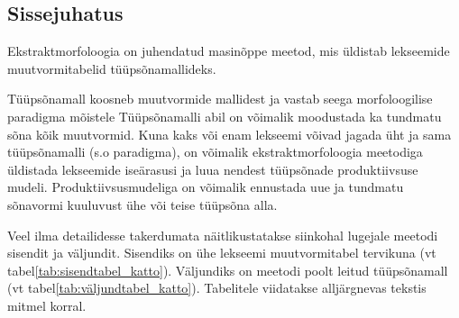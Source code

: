 \documentclass[12pt,a4paper]{article}
\begin{document}
\subsection{Sissejuhatus}
\label{sec:ekstraktmorfoloogia-sissejuhatus}

Ekstraktmorfoloogia on juhendatud masinõppe meetod, mis üldistab lekseemide muutvormitabelid tüüpsõnamallideks.

Tüüpsõna\-mall koosneb muutvormide mallidest ja vastab seega morfoloogilise paradigma mõistele
Tüüpsõna\-malli abil on võimalik moodustada ka tundmatu sõna kõik muutvormid.
Kuna kaks või enam lekseemi võivad jagada üht ja sama tüüpsõna\-malli (s.o paradigma), on võimalik ekstrakt\-morfoloogia meetodiga üldistada lekseemide iseärasusi ja luua nendest tüüpsõnade produktiivsuse mudeli. Produktiivsus\-mudeliga on võimalik ennustada uue ja tundmatu sõnavormi kuuluvust ühe või teise tüüpsõna alla. 


Veel ilma detailidesse takerdumata näitlikustatakse siinkohal lugejale meetodi sisendit ja väljundit. Sisendiks on ühe lekseemi muutvormitabel tervikuna (vt tabel\nobreakspace \ref{tab:sisendtabel_katto}). Väljundiks on meetodi poolt leitud tüüpsõnamall (vt tabel\nobreakspace \ref{tab:väljundtabel_katto}). Tabelitele viidatakse alljärgnevas tekstis mitmel korral.
\end{document}
